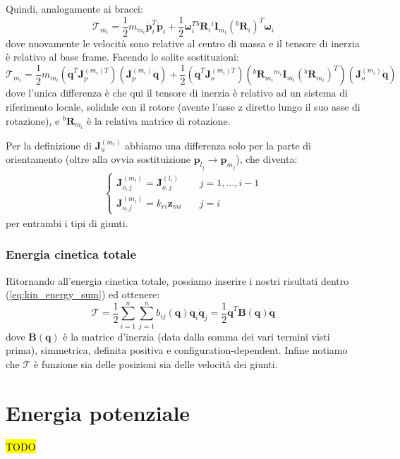 Quindi, analogamente ai bracci:
$$
\mathcal{T}_{m_i}
=
\frac{1}{2} m_{m_i} \bm{\dot{p}}_i^T \bm{\dot{p}}_i
+
\frac{1}{2} \bm{\omega}_i^T {}^b\bm{R}_i {}^i\bm{I}_{m_i} ({}^b\bm{R}_i)^T \bm{\omega}_i
$$
dove nuovamente le velocità sono relative al centro di massa e il tensore di inerzia è relativo al base frame. Facendo le solite sostituzioni:
$$
\mathcal{T}_{m_i}
=
\frac{1}{2} m_{m_i} \left(\bm{\dot{q}}^T \bm{J}_p^{(m_i)T}\right) \left(\bm{J}_p^{(m_i)} \bm{\dot{q}}\right)
+
\frac{1}{2} 
\left(\bm{\dot{q}}^T \bm{J}_o^{(m_i)T}\right)
\left( {}^b\bm{R}_{m_i} {}^{m_i}\bm{I}_{m_i} ({}^b\bm{R}_{m_i})^T \right)
\left(\bm{J}_o^{(m_i)} \bm{\dot{q}}\right)
$$
dove l'unica differenza è che qui il tensore di inerzia è relativo ad un sistema di riferimento locale, solidale con il rotore (avente l’asse z diretto lungo il suo asse di rotazione), e ${}^b\bm{R}_{m_i}$ è la relativa matrice di rotazione.

Per la definizione di $\bm{J}_u^{(m_i)}$ abbiamo una differenza solo per la parte di orientamento (oltre alla ovvia sostituizione $\bm{p}_{l_j} \rightarrow \bm{p}_{m_j}$), che diventa:
\begin{align*}
	\begin{cases}
		\bm{J}^{(m_i)}_{o,j} = \bm{J}^{(l_i)}_{o,j} & \quad j=1,\dots,i-1 \\
		\bm{J}^{(m_i)}_{o,j} = k_{ri}\bm{z}_{mi} & \quad j=i
	\end{cases}
\end{align*}
per entrambi i tipi di giunti.


\vspace*{5pt}
\subsubsection{Energia cinetica totale}
Ritornando all'energia cinetica totale, possiamo inserire i nostri risultati dentro (\ref{eq:kin_energy_sum}) ed ottenere:
\begin{equation}\label{eq:kin_energy}
\boxed{
\mathcal{T}
= 
\frac{1}{2}
\sum_{i=1}^n
\sum_{j=1}^n
b_{ij}(\bm{q}) \dot{\bm{q}}_i \dot{\bm{q}}_j
=
\frac{1}{2} \dot{\bm{q}}^T \bm{B}(\bm{q}) \dot{\bm{q}}
}
\end{equation}
dove $\bm{B}(\bm{q})$ è la matrice d’inerzia (data dalla somma dei vari termini visti prima), simmetrica, definita positiva e configuration-dependent. Infine notiamo che $\mathcal{T}$ è funzione sia delle posizioni sia delle velocità dei giunti.





\section{Energia potenziale}
\hl{TODO}